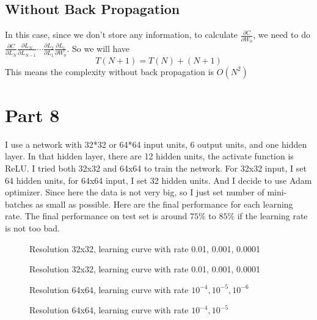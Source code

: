 \documentclass[12pt]{article}
\begin{document}
\subsection*{Without Back Propagation}
In this case, since we don't store any information, to calculate $\frac{\partial C}{\partial W_0}$, we need to do $\frac{\partial C}{\partial L_N}\frac{\partial L_N}{\partial L_{N-1}}\cdots \frac{\partial L_2}{\partial L_1}\frac{\partial L_1}{\partial W_0}$. So we will have
\[
    T(N+1) = T(N) + (N + 1)
\]
This means the complexity without back propagation is $O(N^2)$

\section*{Part 8}
I use a network with 32*32 or 64*64 input units, 6 output units, and one hidden layer. In that hidden layer, there are 12 hidden units, the activate function is ReLU. I tried both 32x32 and 64x64 to train the network. For 32x32 input, I set 64 hidden units, for 64x64 input, I set 32 hidden units. And I decide to use Adam optimizer. Since here the data is not very big, so I just set number of mini-batches as small as possible. Here are the final performance for each learning rate. The final performance on test set is around $75\%$ to $85\%$ if the learning rate is not too bad.
\begin{figure}[h]
    \qquad
    \qquad
    \caption{Resolution 32x32, learning curve with rate 0.01, 0.001, 0.0001}
\end{figure}
\begin{figure}[h]
    \qquad
    \qquad
    \caption{Resolution 32x32, learning curve with rate 0.01, 0.001, 0.0001}
\end{figure}
\begin{figure}[h]
    \qquad
    \caption{Resolution 64x64, learning curve with rate $10^{-4},10^{-5},10^{-6}$}
\end{figure}
\begin{figure}[H]
    \qquad
    \caption{Resolution 64x64, learning curve with rate $10^{-4},10^{-5}$}
\end{figure}
\end{document}
